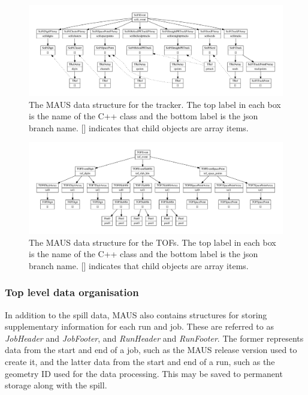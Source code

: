 \documentclass{JINST}
\begin{document}
\begin{figure}[ptb]
\centering
\includegraphics[width=1.0\textheight,angle=90,origin=c]{figs/scifi_datastructure.pdf}
\caption{The MAUS data structure for the tracker. The top label in each box is the name of the C++ class and the bottom label is the json branch name. []  indicates that child objects are array items.}
\label{fig:datastructure-recon-scifi}
\end{figure}

\begin{figure}[ptb]
\centering
\includegraphics[width=1.0\textwidth]{figs/tof_datastructure.pdf}
\caption{The MAUS data structure for the TOFs. The top label in each box is the name of the C++ class and the bottom label is the json branch name. [] indicates that child objects are array items.}
\label{fig:datastructure-recon-tof}
\end{figure}

\FloatBarrier

\subsubsection{Top level data organisation} \label{sec:top-level-datastr}

In addition to the spill data, MAUS also contains structures for storing supplementary information for each run and job. These are referred to as \emph{JobHeader} and \emph{JobFooter}, and \emph{RunHeader} and \emph{RunFooter}. The former represents data from the start and end of a job, such as the MAUS release version used to create it, and the latter data from the start and end of a run, such as the geometry ID used for the data processing. This may be saved to permanent storage along with the spill.
\end{document}
